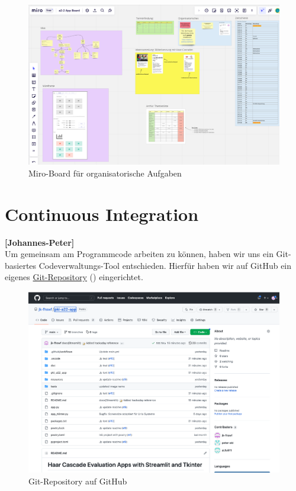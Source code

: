 \begin{figure}[ht]
	\includegraphics[scale=0.25]{../images/miro_board.png}
	\caption{Miro-Board für organisatorische Aufgaben}
	\label{fig:miro}
\end{figure}

\newpage

\section{Continuous Integration}

\textbf{[Johannes-Peter]} \\

Um gemeinsam am Programmcode arbeiten zu können, haben wir uns ein Git-basiertes 
Codeverwaltungs-Tool entschieden. Hierfür haben wir auf GitHub ein eigenes
\href{https://github.com/jk-fhswf/pki-a22-app}{Git-Repository} () eingerichtet.


\begin{figure}[!h]
 	\includegraphics[scale=0.25]{../images/ci_git.png}
 	\caption{Git-Repository auf GitHub}
	\label{fig:git}	
\end{figure}

